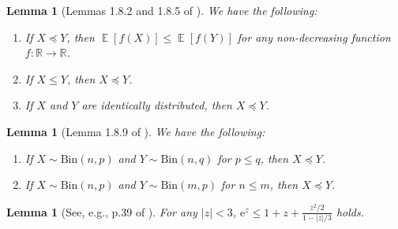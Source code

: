 \documentclass[letterpaper,11pt]{article}
\newtheorem{lemma}[theorem]{Lemma}
\DeclareMathOperator*{\E}{\mathbb{E}}
\begin{document}
\begin{lemma}[Lemmas 1.8.2 and 1.8.5 of \cite{Doe18}]
    \label{lem:Stochastic domination}
    We have the following:
    \begin{enumerate}
        \item If $X\preceq Y$, then $\E[f(X)]\leq \E[f(Y)]$ for any non-decreasing function $f:\mathbb{R}\to \mathbb{R}$.
        \item If $X\leq Y$, then $X\preceq Y$.
        \item If $X$ and $Y$ are identically distributed, then $X\preceq Y$.
    \end{enumerate}
\end{lemma}

\begin{lemma}[Lemma 1.8.9 of \cite{Doe18}]
    \label{lem:binomial dominance}
    We have the following:
    \begin{enumerate}
        \item If $X\sim \mathrm{Bin}(n,p)$ and $Y\sim \mathrm{Bin}(n,q)$ for $p\leq q$, then $X\preceq Y$.
        \item If $X\sim \mathrm{Bin}(n,p)$ and $Y\sim \mathrm{Bin}(m,p)$ for $n\leq m$, then $X\preceq Y$.
    \end{enumerate}
\end{lemma}

\begin{lemma}[See, e.g., p.39 of \cite{Ver18}]
\label{lem:Bernstein lemma}
For any $|z|<3$, $\mathrm{e}^z\leq 1+z+\frac{z^2/2}{1-|z|/3}$ holds.
\end{lemma}
\end{document}
